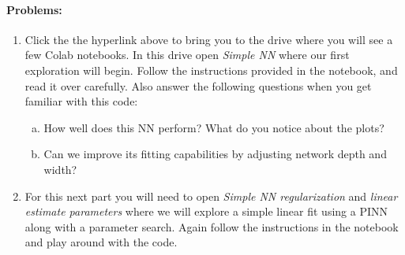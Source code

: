 \documentclass{exam}
\begin{document}
\paragraph{Problems:}
\begin{enumerate}[(1)]
    \item Click the the hyperlink above to bring you to the drive where you will see a few Colab notebooks. In this drive open \emph{Simple NN} where our first exploration will begin. Follow the instructions provided in the notebook, and read it over carefully.
    Also answer the following questions when you get familiar with this code:
    \begin{enumerate}[(a)]
        \item How well does this NN perform? What do you notice about the plots?
        \item Can we improve its fitting capabilities by adjusting network depth and width? 
    \end{enumerate}
    \item For this next part you will need to open \emph{Simple NN regularization} and \emph{linear estimate parameters} where we will explore a simple linear fit using a PINN along with a parameter search. Again follow the instructions in the notebook and play around with the code. 
    

\end{enumerate}
\end{document}
